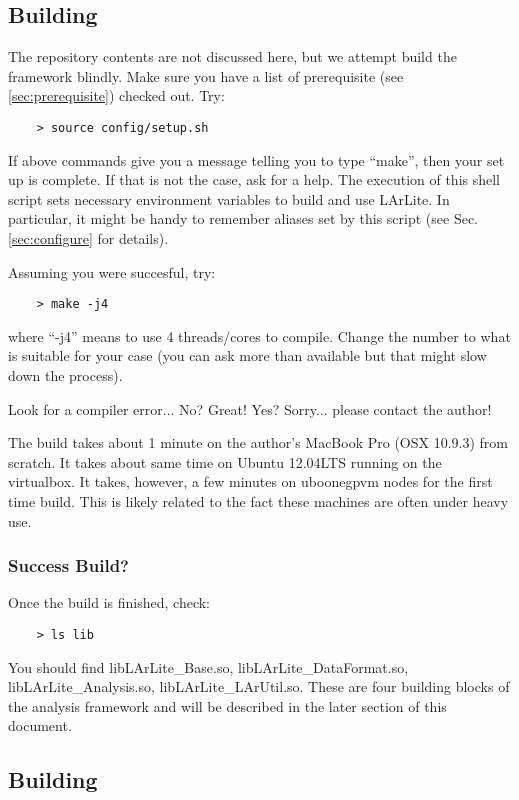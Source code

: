 
\subsection{Building \Core}

The repository contents are not discussed here, but we attempt build the framework blindly.
Make sure you have a list of prerequisite (see \ref{sec:prerequisite}) checked out.
Try:
\begin{lstlisting}
    > source config/setup.sh
\end{lstlisting}

If above commands give you a message telling you to type ``make'', then your set up is complete.
If that is not the case, ask for a help. The execution of this shell script sets necessary
environment variables to build and use LArLite. In particular, it might be handy to remember 
aliases set by this script (see Sec.\ref{sec:configure} for details).

Assuming you were succesful, try:
\begin{lstlisting}
    > make -j4
\end{lstlisting}

where ``-j4'' means to use 4 threads/cores to compile. 
Change the number to what is suitable for your case (you can ask more than available but that might slow down the process).

Look for a compiler error... No? Great! Yes? Sorry... please contact the author!

The build takes about 1 minute on the author's MacBook Pro (OSX 10.9.3) from scratch. 
It takes about same time on Ubuntu 12.04LTS running on the virtualbox. 
It takes, however, a few minutes on uboonegpvm nodes for the first time build.
This is likely related to the fact these machines are often under heavy use.

\subsubsection{Success Build?}

Once the build is finished, check:
\begin{lstlisting}
    > ls lib
\end{lstlisting}
You should find {\ttfamily libLArLite\_Base.so, libLArLite\_DataFormat.so, libLArLite\_Analysis.so, libLArLite\_LArUtil.so}. 
These are four building blocks of the analysis framework and will be described in the later section of this document.  

\subsection{Building \UserDev}

